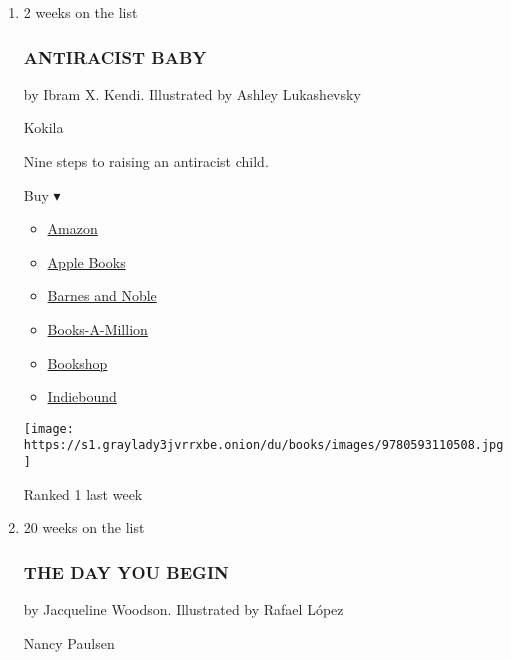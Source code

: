 \begin{enumerate}
\def\labelenumi{\arabic{enumi}.}
\item
  2 weeks on the list

  \hypertarget{antiracist-baby}{%
  \subsubsection{ANTIRACIST BABY}\label{antiracist-baby}}

  by Ibram X. Kendi. Illustrated by Ashley Lukashevsky

  Kokila

  Nine steps to raising an antiracist child.

  Buy ▾

  \begin{itemize}
  \tightlist
  \item
    \href{https://www.amazon.com/dp/0593110501?tag=NYTBSREV-20\&tag=NYTBS-20}{Amazon}
  \item
    \href{https://du-gae-books-dot-nyt-du-prd.appspot.com/buy?title=ANTIRACIST+BABY\&author=Ibram+X+Kendi}{Apple
    Books}
  \item
    \href{https://www.anrdoezrs.net/click-7990613-11819508?url=https\%3A\%2F\%2Fwww.barnesandnoble.com\%2Fw\%2F\%3Fean\%3D9780593110508}{Barnes
    and Noble}
  \item
    \href{https://www.anrdoezrs.net/click-7990613-35140?url=https\%3A\%2F\%2Fwww.booksamillion.com\%2Fp\%2FANTIRACIST\%2BBABY\%2FIbram\%2BX\%2BKendi\%2F9780593110508}{Books-A-Million}
  \item
    \href{https://bookshop.org/a/3546/9780593110508}{Bookshop}
  \item
    \href{https://www.indiebound.org/book/9780593110508?aff=NYT}{Indiebound}
  \end{itemize}

  \texttt{[image: https://s1.graylady3jvrrxbe.onion/du/books/images/9780593110508.jpg]}

  Ranked 1 last week
\item
  20 weeks on the list

  \hypertarget{the-day-you-begin}{%
  \subsubsection{THE DAY YOU BEGIN}\label{the-day-you-begin}}

  by Jacqueline Woodson. Illustrated by Rafael López

  Nancy Paulsen


\end{enumerate}
